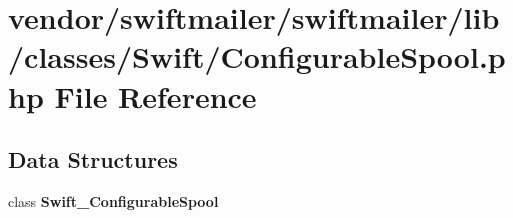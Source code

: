 \section{vendor/swiftmailer/swiftmailer/lib/classes/\+Swift/\+Configurable\+Spool.php File Reference}
\label{_configurable_spool_8php}
\subsection*{Data Structures}
\begin{DoxyCompactItemize}
\item 
class {\bf Swift\+\_\+\+Configurable\+Spool}
\end{DoxyCompactItemize}
